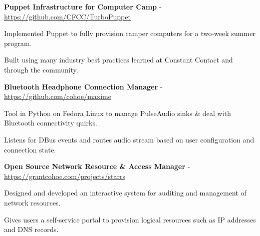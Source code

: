 \documentclass[10pt]{article}
\newcommand{\halfblankline}{\quad\vspace{-0.5\baselineskip}\pagebreak[3]}
\begin{document}
\textbf{Puppet Infrastructure for Computer Camp} - \href{https://github.com/CFCC/TurboPuppet}{https://github.com/CFCC/TurboPuppet}
\begin{outerlist}
    \item[]
            \begin{innerlist}
                \item Implemented Puppet to fully provision camper computers for a two-week summer program.
		 \item Built using many industry best practices learned at Constant Contact and through the community.
            \end{innerlist}
\end{outerlist}
\halfblankline

\textbf{Bluetooth Headphone Connection Manager} - \href{https://github.com/cohoe/maxime}{https://github.com/cohoe/maxime}
\begin{outerlist}
    \item[]
            \begin{innerlist}
                \item Tool in Python on Fedora Linux to manage PulseAudio sinks \& deal with Bluetooth connectivity quirks.
                \item Listens for DBus events and routes audio stream based on user configuration and connection state.
            \end{innerlist}
\end{outerlist}
\halfblankline

\textbf{Open Source Network Resource \& Access Manager} - \href{https://www.grantcohoe.com/projects/starrs}{https://grantcohoe.com/projects/starrs}
\begin{outerlist}
    \item[]
            \begin{innerlist}
                \item Designed and developed an interactive system for auditing and management of network resources.
                \item Gives users a self-service portal to provision logical resources such as IP addresses and DNS records.
            \end{innerlist}
\end{outerlist}

\halfblankline

%
%
\end{document}
